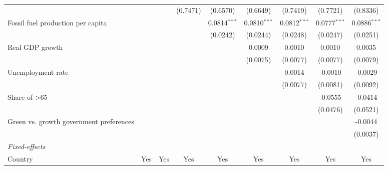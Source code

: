 \begin{table}[htbp]
\begin{tabular}{lcccccccc}
                                                                &                 &          & (0.7471) & (0.6570)       & (0.6649)       & (0.7419)       & (0.7721)       & (0.8336)\\   
      Fossil fuel production per capita                         &                 &          &          & 0.0814$^{***}$ & 0.0810$^{***}$ & 0.0812$^{***}$ & 0.0777$^{***}$ & 0.0886$^{***}$\\   
                                                                &                 &          &          & (0.0242)       & (0.0244)       & (0.0248)       & (0.0247)       & (0.0251)\\   
      Real GDP growth                                           &                 &          &          &                & 0.0009         & 0.0010         & 0.0010         & 0.0035\\   
                                                                &                 &          &          &                & (0.0075)       & (0.0077)       & (0.0077)       & (0.0079)\\   
      Unemployment rate                                         &                 &          &          &                &                & 0.0014         & -0.0010        & -0.0029\\   
                                                                &                 &          &          &                &                & (0.0077)       & (0.0081)       & (0.0092)\\   
      Share of >65                                              &                 &          &          &                &                &                & -0.0555        & -0.0414\\   
                                                                &                 &          &          &                &                &                & (0.0476)       & (0.0521)\\   
      Green vs. growth government preferences                   &                 &          &          &                &                &                &                & -0.0044\\   
                                                                &                 &          &          &                &                &                &                & (0.0037)\\   
      \midrule
      \emph{Fixed-effects}\\
      Country                                                   & Yes             & Yes      & Yes      & Yes            & Yes            & Yes            & Yes            & Yes\\  

\end{tabular}
\end{table}
